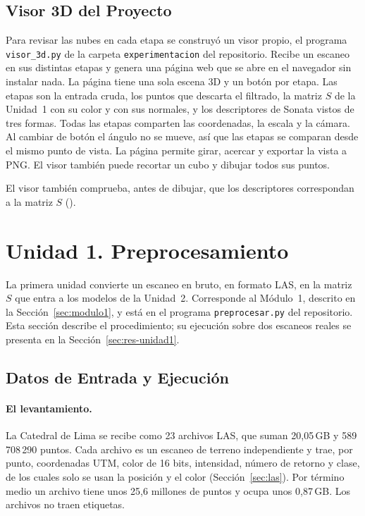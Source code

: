 \FloatBarrier
\subsection{Visor 3D del Proyecto}
\label{sec:visor}

Para revisar las nubes en cada etapa se construyó un visor propio, el programa
\texttt{visor\_3d.py} de la carpeta \texttt{experimentacion} del repositorio.
Recibe un escaneo en sus distintas etapas y genera una página web que se abre en
el navegador sin instalar nada. La página tiene una sola escena 3D y un botón por
etapa. Las etapas son la entrada cruda, los puntos que descarta el filtrado, la
matriz $S$ de la Unidad~1 con su color y con sus normales, y los descriptores de
Sonata vistos de tres formas. Todas las etapas comparten las coordenadas, la
escala y la cámara. Al cambiar de botón el ángulo no se mueve, así que las etapas
se comparan desde el mismo punto de vista. La página permite girar, acercar y
exportar la vista a PNG. El visor también puede recortar un cubo y dibujar todos
sus puntos.

El visor también comprueba, antes de dibujar, que los descriptores correspondan
a la matriz $S$ ().

\FloatBarrier
\section{Unidad 1. Preprocesamiento}
\label{sec:unidad1}

La primera unidad convierte un escaneo en bruto, en formato LAS, en la matriz
$S$ que entra a los modelos de la Unidad~2. Corresponde al Módulo~1, descrito en
la Sección~\ref{sec:modulo1}, y está en el programa \texttt{preprocesar.py} del
repositorio. Esta sección describe el procedimiento; su ejecución sobre dos
escaneos reales se presenta en la Sección~\ref{sec:res-unidad1}.

\FloatBarrier
\subsection{Datos de Entrada y Ejecución}
\label{sec:u1-datos}

\paragraph*{El levantamiento.}
La Catedral de Lima se recibe como 23 archivos LAS, que suman 20{,}05\,GB y
589\,708\,290 puntos. Cada archivo es un escaneo de terreno independiente y
trae, por punto, coordenadas UTM, color de 16 bits, intensidad, número de retorno
y clase, de los cuales solo se usan la posición y el color
(Sección~\ref{sec:las}). Por término medio un archivo tiene unos 25{,}6 millones
de puntos y ocupa unos 0{,}87\,GB. Los archivos no traen etiquetas.


